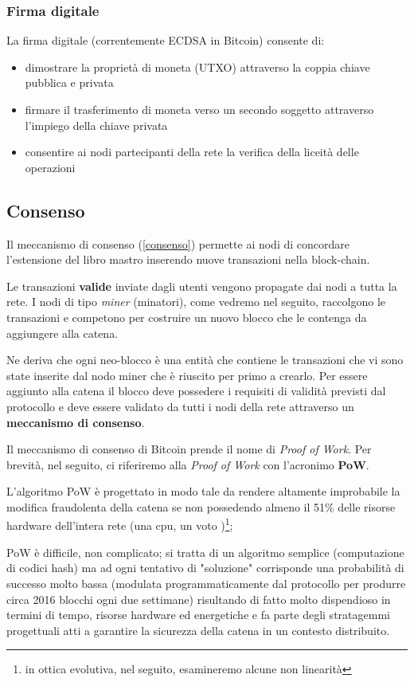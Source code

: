 \documentclass{book}
\theoremstyle{definition}
\begin{document}
\subsubsection{Firma digitale}

La firma digitale (correntemente ECDSA in Bitcoin) consente di:

\begin{itemize}
    \item dimostrare la proprietà di moneta (UTXO) attraverso la coppia chiave pubblica e privata
    \item firmare il trasferimento di moneta verso un secondo soggetto attraverso l'impiego della chiave privata
    \item consentire ai nodi partecipanti della rete la verifica della liceità delle operazioni
\end{itemize}

\subsection{Consenso}

Il meccanismo di consenso (\ref{consenso}) permette ai nodi di concordare l'estensione del libro mastro inserendo nuove transazioni nella block-chain.

Le transazioni \textbf{valide} inviate dagli utenti vengono propagate dai nodi a tutta la rete. I nodi di tipo \textit{miner} (minatori), come vedremo nel seguito, raccolgono le transazioni e competono per
costruire un nuovo blocco che le contenga da aggiungere alla catena. 

Ne deriva che ogni neo-blocco è una entità che contiene le transazioni che vi sono state inserite dal nodo miner che è riuscito per primo a crearlo. 
Per essere aggiunto alla catena il blocco deve possedere i requisiti di validità previsti dal protocollo e deve essere validato da tutti i nodi della rete
attraverso un \textbf{meccanismo di consenso}.

Il meccanismo di consenso di Bitcoin prende il nome di \textit{Proof of Work}.
Per brevità, nel seguito, ci riferiremo alla \textit{Proof of Work} con l'acronimo \textbf{PoW}.

L'algoritmo PoW è progettato in modo tale da rendere altamente improbabile la modifica fraudolenta della catena se non possedendo almeno il 51\% delle risorse hardware dell'intera rete (una cpu, un voto \cite{Nakamoto})\footnote{in ottica evolutiva, nel seguito, esamineremo alcune non linearità}; 

PoW è difficile, non complicato; si tratta di un algoritmo semplice (computazione di codici hash) ma ad ogni tentativo di "soluzione" corrisponde una probabilità di successo molto bassa (modulata programmaticamente dal protocollo per produrre circa 2016 blocchi ogni due settimane) risultando di fatto molto dispendioso in termini di tempo, 
risorse hardware ed energetiche e fa parte degli stratagemmi progettuali atti a garantire la sicurezza della catena in un contesto distribuito.
\end{document}
